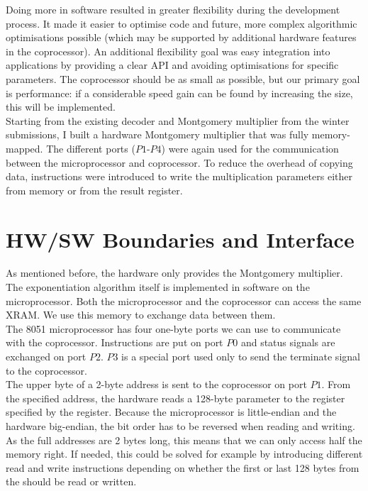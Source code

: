 \documentclass[a4paper]{article}
\begin{document}
Doing more in software resulted in greater flexibility during the development process. It made it easier to optimise  code and  future, more complex algorithmic optimisations possible (which may be supported by additional hardware features in the coprocessor). An additional flexibility goal was easy integration into applications by providing a clear API and avoiding optimisations for specific parameters. The coprocessor should be as small as possible, but our primary goal is performance: if a considerable speed gain can be found by increasing the size, this will be implemented.\\

Starting from the existing decoder and Montgomery multiplier from the winter submissions, I built a hardware Montgomery multiplier that was fully memory-mapped. The different ports ($P1$-$P4$) were again used for the communication between the microprocessor and coprocessor. To reduce the overhead of copying data, instructions were introduced to write the multiplication parameters either from memory or from the result register.

\section{HW/SW Boundaries and Interface}
\label{sec:hwsw_boundaries_and_interface}

As mentioned before, the hardware only provides the Montgomery multiplier. The exponentiation algorithm itself is implemented in software on the microprocessor. Both the microprocessor and the coprocessor can access the same XRAM. We use this memory to exchange data between them.\\

The 8051 microprocessor has four one-byte ports we can use to communicate with the coprocessor. Instructions are put on port $P0$ and status signals are exchanged on port $P2$. $P3$ is a special port used only to send the terminate signal to the coprocessor.\\

The upper byte of a 2-byte address is sent to the coprocessor on port $P1$. From the specified address, the hardware reads a 128-byte parameter to the register specified by the register. Because the microprocessor is little-endian and the hardware big-endian, the bit order has to be reversed when reading and writing. As the full addresses are 2 bytes long, this means that we can only access half the memory right. If needed, this could be solved for example by introducing different read and write instructions depending on whether the first or last 128 bytes from the should be read or written.
\end{document}
